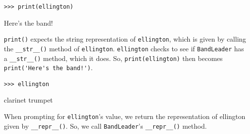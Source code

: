 \begin{blocksection}
\vspace{2\baselineskip}

\begin{lstlisting}
>>> print(ellington)
\end{lstlisting}
\begin{solution}[.2in]
Here's the band!

\lstinline{print()} expects the string representation of \lstinline{ellington}, which is given by calling the \lstinline{__str__()} method of \lstinline{ellington}. \lstinline{ellington} checks to see if \lstinline{BandLeader} has a \lstinline{__str__()} method, which it does. So, \lstinline{print(ellington)} then becomes \lstinline{print('Here's the band!')}.
\end{solution}

\vspace{2\baselineskip}
\end{blocksection}
\begin{blocksection}
\begin{lstlisting}
>>> ellington
\end{lstlisting}
\begin{solution}[.2in]
clarinet trumpet

When prompting for \lstinline{ellington}’s value, we return the representation of ellington given by \lstinline{__repr__()}. So, we call \lstinline{BandLeader}’s \lstinline{__repr__()} method.

\end{solution}

\end{blocksection}

